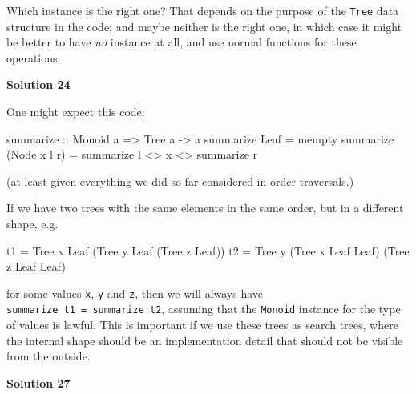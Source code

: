 \documentclass[11pt,
  american,
  DIV13]{article}
\newenvironment{Shaded}{}{}
\newcommand{\DataTypeTok}[1]{\textcolor[rgb]{0.56,0.13,0.00}{#1}}
\newcommand{\FunctionTok}[1]{\textcolor[rgb]{0.02,0.16,0.49}{#1}}
\newcommand{\NormalTok}[1]{#1}
\newcommand{\OperatorTok}[1]{\textcolor[rgb]{0.40,0.40,0.40}{#1}}
\newcommand{\OtherTok}[1]{\textcolor[rgb]{0.00,0.44,0.13}{#1}}
\begin{document}
Which instance is the right one? That depends on the purpose of the
\texttt{Tree} data structure in the code; and maybe neither is the right
one, in which case it might be better to have \emph{no} instance at all,
and use normal functions for these operations.

\textbf{Solution 24}

One might expect this code:

\begin{Shaded}
\begin{Highlighting}[]
\OtherTok{summarize ::} \DataTypeTok{Monoid}\NormalTok{ a }\OtherTok{=\textgreater{}} \DataTypeTok{Tree}\NormalTok{ a }\OtherTok{{-}\textgreater{}}\NormalTok{ a}
\NormalTok{summarize }\DataTypeTok{Leaf} \OtherTok{=} \FunctionTok{mempty}
\NormalTok{summarize (}\DataTypeTok{Node}\NormalTok{ x l r) }\OtherTok{=}\NormalTok{ summarize l }\OperatorTok{\textless{}\textgreater{}}\NormalTok{ x }\OperatorTok{\textless{}\textgreater{}}\NormalTok{ summarize r}
\end{Highlighting}
\end{Shaded}

(at least given everything we did so far considered in-order
traversals.)

If we have two trees with the same elements in the same order, but in a
different shape, e.g.

\begin{Shaded}
\begin{Highlighting}[]
\NormalTok{t1 }\OtherTok{=} \DataTypeTok{Tree}\NormalTok{ x }\DataTypeTok{Leaf}\NormalTok{ (}\DataTypeTok{Tree}\NormalTok{ y }\DataTypeTok{Leaf}\NormalTok{ (}\DataTypeTok{Tree}\NormalTok{ z }\DataTypeTok{Leaf}\NormalTok{))}
\NormalTok{t2 }\OtherTok{=} \DataTypeTok{Tree}\NormalTok{ y (}\DataTypeTok{Tree}\NormalTok{ x }\DataTypeTok{Leaf} \DataTypeTok{Leaf}\NormalTok{) (}\DataTypeTok{Tree}\NormalTok{ z }\DataTypeTok{Leaf} \DataTypeTok{Leaf}\NormalTok{)}
\end{Highlighting}
\end{Shaded}

for some values \texttt{x}, \texttt{y} and \texttt{z}, then we will
always have \texttt{summarize\ t1\ =\ summarize\ t2}, assuming that the
\texttt{Monoid} instance for the type of values is lawful. This is
important if we use these trees as search trees, where the internal
shape should be an implementation detail that should not be visible from
the outside.

\textbf{Solution 27}
\end{document}
